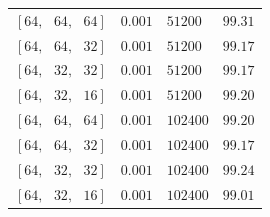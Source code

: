 \documentclass[11pt]{article}
\begin{document}
\begin{table}[htbp]
{\begin{tabular}{@{}llll@{}}
$\left[64,\text{ }64,\text{ }64\right]$ & $0.001$ & $51200$ & $99.31$ \\
$\left[64,\text{ }64,\text{ }32\right]$ & $0.001$ & $51200$ & $99.17$ \\
$\left[64,\text{ }32,\text{ }32\right]$ & $0.001$ & $51200$ & $99.17$ \\
$\left[64,\text{ }32,\text{ }16\right]$ & $0.001$ & $51200$ & $99.20$ \\
$\left[64,\text{ }64,\text{ }64\right]$ & $0.001$ & $102400$ & $99.20$ \\
$\left[64,\text{ }64,\text{ }32\right]$ & $0.001$ & $102400$ & $99.17$ \\
$\left[64,\text{ }32,\text{ }32\right]$ & $0.001$ & $102400$ & $99.24$ \\
$\left[64,\text{ }32,\text{ }16\right]$ & $0.001$ & $102400$ & $99.01$ \\
\hline
\end{tabular}
}
\end{table}
\end{document}
